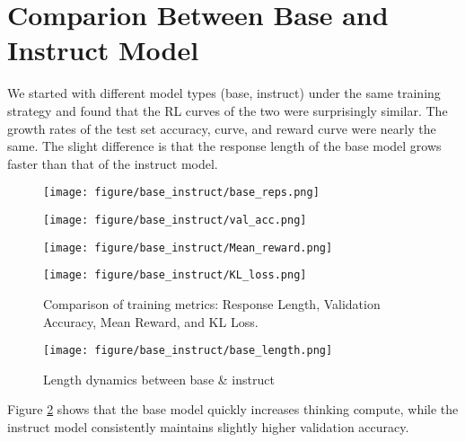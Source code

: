 \section{Comparion Between Base and Instruct Model}
We started with different model types (base, instruct) under the same training strategy and found that the RL curves of the two were surprisingly similar. The growth rates of the test set accuracy, curve, and reward curve were nearly the same. The slight difference is that the response length of the base model grows faster than that of the instruct model.
\label{base_comp}
\begin{figure}[H]
    \centering
    \begin{minipage}{0.48\textwidth}
        \centering
        \texttt{[image: figure/base\_instruct/base\_reps.png]}
    \end{minipage}
    \hfill
    \begin{minipage}{0.48\textwidth}
        \centering
        \texttt{[image: figure/base\_instruct/val\_acc.png]}
    \end{minipage}

    \vspace{1em} %
    \begin{minipage}{0.48\textwidth}
        \centering
        \texttt{[image: figure/base\_instruct/Mean\_reward.png]}
    \end{minipage}
    \hfill
    \begin{minipage}{0.48\textwidth}
        \centering
        \texttt{[image: figure/base\_instruct/KL\_loss.png]}
    \end{minipage}

    \caption{Comparison of training metrics: Response Length, Validation Accuracy, Mean Reward, and KL Loss.}
    \label{fig:training_metrics}
\end{figure}

\begin{figure}[H]
    \centering
    \texttt{[image: figure/base\_instruct/base\_length.png]}
    \caption{Length dynamics between base \& instruct}
    \label{fig:base_length}
\end{figure}
Figure \ref{fig:base_length} shows that the base model quickly increases thinking compute, while the instruct model consistently maintains slightly higher validation accuracy.


